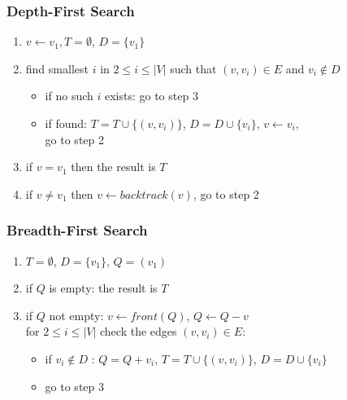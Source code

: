 \documentclass[dvipsnames]{beamer}
\begin{document}
\begin{frame}
  \frametitle{Depth-First Search}

  \begin{enumerate}
    \item $v \leftarrow v_1, T=\emptyset$, $D=\{v_1\}$

    \pause
    \item find smallest $i$ in $2 \leq i \leq |V|$
      such that $(v,v_i) \in E$ and $v_i \notin D$
      \begin{itemize}
        \item if no such $i$ exists: go to step 3
        \item if found: $T=T \cup \{(v,v_i)\}$, $D=D \cup \{v_i\}$,
          $v \leftarrow v_i$,\\
          go to step 2
      \end{itemize}

    \pause
    \item if $v=v_1$ then the result is $T$

    \pause
    \item if $v \neq v_1$ then $v \leftarrow backtrack(v)$, go to step 2
  \end{enumerate}
\end{frame}


\begin{frame}
  \frametitle{Breadth-First Search}

  \begin{enumerate}
    \item $T=\emptyset$, $D=\{v_1\}$, $Q=(v_1)$

    \pause
    \item if $Q$ is empty: the result is $T$
    \item if $Q$ not empty: $v \leftarrow front(Q)$, $Q \leftarrow Q - v$\\
      for $2 \leq i \leq |V|$ check the edges $(v,v_i) \in E$:
    \begin{itemize}
      \item if $v_i \notin D$ : $Q = Q + v_i$, $T = T \cup \{(v,v_i)\}$,
        $D=D \cup \{v_i\}$
       \item go to step 3
    \end{itemize}
  \end{enumerate}
\end{frame}

\end{document}
